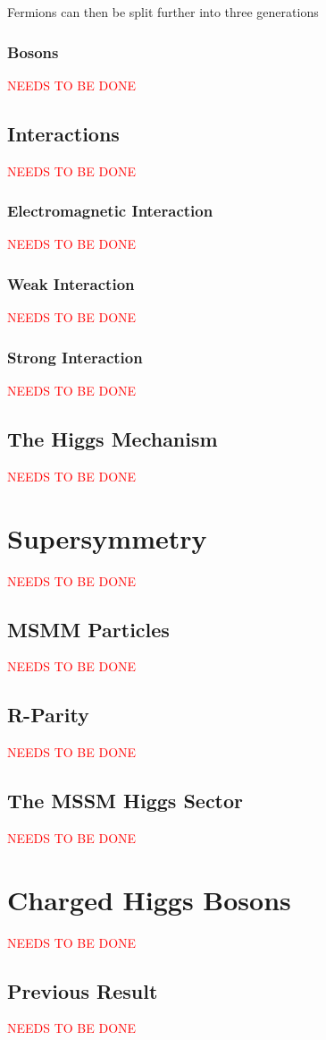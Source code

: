 		Fermions can then be split further into three generations

		\subsubsection{Bosons}
			\textcolor{red}{NEEDS TO BE DONE}

	\subsection{Interactions}
		\textcolor{red}{NEEDS TO BE DONE}

		\subsubsection{Electromagnetic Interaction}

			\textcolor{red}{NEEDS TO BE DONE}

		\subsubsection{Weak Interaction}
			\textcolor{red}{NEEDS TO BE DONE}

		\subsubsection{Strong Interaction}
			\textcolor{red}{NEEDS TO BE DONE}

	\subsection{The Higgs Mechanism}
		\textcolor{red}{NEEDS TO BE DONE}

\section{Supersymmetry}
	\textcolor{red}{NEEDS TO BE DONE}

	\subsection{MSMM Particles}
		\textcolor{red}{NEEDS TO BE DONE}

	\subsection{R-Parity}
		\textcolor{red}{NEEDS TO BE DONE}

	\subsection{The MSSM Higgs Sector}
		\textcolor{red}{NEEDS TO BE DONE}

\section{Charged Higgs Bosons}
	\textcolor{red}{NEEDS TO BE DONE}

	\subsection{Previous Result}
		\textcolor{red}{NEEDS TO BE DONE}